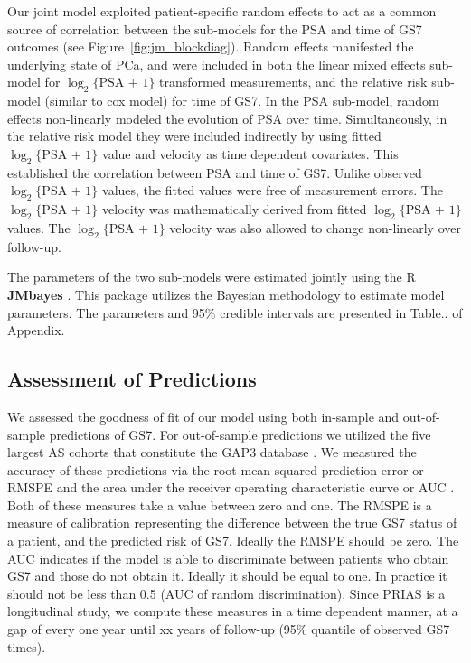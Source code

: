 Our joint model exploited patient-specific random effects \citep{laird1982random} to act as a common source of correlation between the sub-models for the PSA and time of GS7 outcomes (see Figure~\ref{fig:jm_blockdiag}). Random effects manifested the underlying state of PCa, and were included in both the linear mixed effects sub-model for $\log_2\{\mbox{PSA + 1}\}$ transformed measurements, and the relative risk sub-model (similar to cox model) for time of GS7. In the PSA sub-model, random effects non-linearly modeled the evolution of PSA over time. Simultaneously, in the relative risk model they were included indirectly by using fitted $\log_2\{\mbox{PSA + 1}\}$ value and velocity as time dependent covariates. This established the correlation between PSA and time of GS7. Unlike observed $\log_2\{\mbox{PSA + 1}\}$ values, the fitted values were free of measurement errors. The $\log_2\{\mbox{PSA + 1}\}$ velocity was mathematically derived from fitted $\log_2\{\mbox{PSA + 1}\}$ values. The $\log_2\{\mbox{PSA + 1}\}$ velocity was also allowed to change non-linearly over follow-up.

The parameters of the two sub-models were estimated jointly using the R \textbf{JMbayes} \citep{rizopoulosJMbayes}. This package utilizes the Bayesian methodology to estimate model parameters. The parameters and 95\% credible intervals are presented in Table.. of Appendix.

\subsection{Assessment of Predictions}
We assessed the goodness of fit of our model using both in-sample and out-of-sample predictions of GS7. For out-of-sample predictions we utilized the five largest AS cohorts that constitute the GAP3 database \citep{gap3_2018}. We measured the accuracy of these predictions via the root mean squared prediction error or RMSPE \cite{rizopoulos2017dynamic} and the area under the receiver operating characteristic curve or AUC \cite{rizopoulos2017dynamic}. Both of these measures take a value between zero and one. The RMSPE is a measure of calibration representing the difference between the true GS7 status of a patient, and the predicted risk of GS7. Ideally the RMSPE should be zero. The AUC indicates if the model is able to discriminate between patients who obtain GS7 and those do not obtain it. Ideally it should be equal to one. In practice it should not be less than 0.5 (AUC of random discrimination). Since PRIAS is a longitudinal study, we compute these measures in a time dependent manner, at a gap of every one year until xx years of follow-up (95\% quantile of observed GS7 times).

